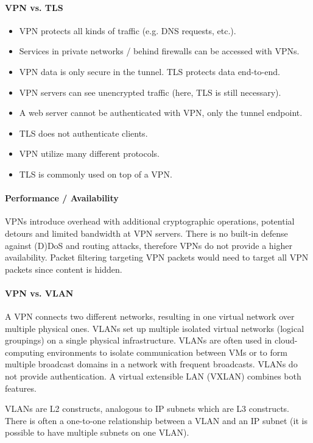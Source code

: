 \paragraph{VPN vs. TLS}
\begin{itemize}
    \item VPN protects all kinds of traffic (e.g. DNS requests, etc.).
    \item Services in private networks / behind firewalls can be accessed with VPNs.
    \item VPN data is only secure in the tunnel. TLS protects data end-to-end.
    \item VPN servers can see unencrypted traffic (here, TLS is still necessary).
    \item A web server cannot be authenticated with VPN, only the tunnel endpoint.
    \item TLS does not authenticate clients.
    \item VPN utilize many different protocols.
    \item TLS is commonly used on top of a VPN.
\end{itemize}

\paragraph{Performance / Availability}
VPNs introduce overhead with additional cryptographic operations, potential detours and limited bandwidth at VPN servers. There is no built-in defense against (D)DoS and routing attacks, therefore VPNs do not provide a higher availability. Packet filtering targeting VPN packets would need to target all VPN packets since content is hidden.

\paragraph{VPN vs. VLAN}
A VPN connects two different networks, resulting in one virtual network over multiple physical ones. VLANs set up multiple isolated virtual networks (logical groupings) on a single physical infrastructure. VLANs are often used in cloud-computing environments to isolate communication between VMs or to form multiple broadcast domains in a network with frequent broadcasts. VLANs do not provide authentication. A virtual extensible LAN (VXLAN) combines both features.

VLANs are L2 constructs, analogous to IP subnets which are L3 constructs. There is often a one-to-one relationship between a VLAN and an IP subnet (it is possible to have multiple subnets on one VLAN).


